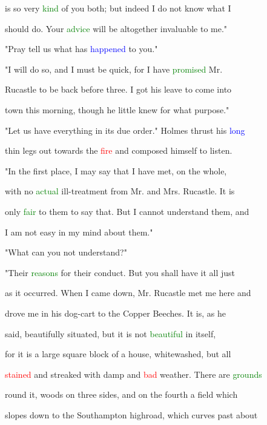  is so very \textcolor{green}{kind} of you both; but indeed I do not know what I

 should do. Your \textcolor{green}{advice} will be altogether invaluable to me."



 \textcolor{BurntOrange}{"Pray} tell us what has \textcolor{blue}{happened} to you."



 "I will do so, and I must be quick, for I have \textcolor{green}{promised} Mr.

 Rucastle to be back before three. I got his \textcolor{BurntOrange}{leave} to come into

 town this morning, though he little knew for what purpose."



 "Let us have everything in its due order." Holmes thrust his \textcolor{blue}{long}

 thin legs out towards the \textcolor{red}{fire} and composed himself to listen.



 "In the first place, I may say that I have met, on the whole,

 with no \textcolor{green}{actual} ill-treatment from Mr. and Mrs. Rucastle. It is

 only \textcolor{green}{fair} to them to say that. But I cannot understand them, and

 I am not easy in my mind about them."



 "What can you not understand?"



 "Their \textcolor{green}{reasons} for their conduct. But you shall have it all just

 as it occurred. When I came down, Mr. Rucastle met me here and

 drove me in his dog-cart to the Copper Beeches. It is, as he

 said, beautifully situated, but it is not \textcolor{green}{beautiful} in itself,

 for it is a large square block of a house, whitewashed, but all

 \textcolor{red}{stained} and streaked with damp and \textcolor{red}{bad} weather. There are \textcolor{green}{grounds}

 round it, woods on three sides, and on the fourth a field which

 slopes down to the Southampton highroad, which curves past about

